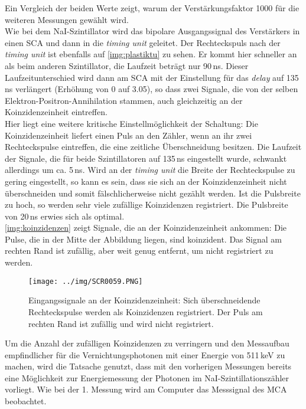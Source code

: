 Ein Vergleich der beiden Werte zeigt, warum der Verstärkungsfaktor 1000 für die weiteren Messungen gewählt wird.\\[\baselineskip]
Wie bei dem NaI-Szintillator wird das bipolare Ausgangssignal des Verstärkers in einen SCA
und dann in die \emph{timing unit} geleitet.
Der Rechteckspuls nach der \emph{timing unit} ist ebenfalls auf \autoref{img:plastiktu} zu sehen.
Er kommt hier schneller an als beim anderen Szintillator, 
die Laufzeit beträgt nur 90\,ns. Dieser Laufzeitunterschied wird dann am SCA mit der
Einstellung für das \emph{delay} auf 135\,ns verlängert (Erhöhung von 0 auf 3.05),
so dass zwei Signale, die von der selben
Elektron-Positron-Annihilation stammen, auch gleichzeitig an der Koinzidenzeinheit eintreffen.\\
Hier liegt eine weitere kritische Einstellmöglichkeit der Schaltung:
Die Koinzidenzeinheit liefert einen Puls an den Zähler, wenn an ihr zwei Rechteckspulse eintreffen,
die eine zeitliche Überschneidung besitzen.
Die Laufzeit der Signale, die für beide Szintillatoren auf 135\,ns eingestellt wurde,
schwankt allerdings um ca. 5\,ns. Wird an der \emph{timing unit}
die Breite der Rechteckspulse zu gering eingestellt, so
kann es sein, dass sie sich an der Koinzidenzeinheit nicht überschneiden und somit fälschlicherweise nicht
gezählt werden. Ist die Pulsbreite zu hoch, so werden sehr viele zufällige Koinzidenzen registriert.
Die Pulsbreite von 20\,ns erwies sich als optimal.\\
\autoref{img:koinzidenzen} zeigt Signale, die an der Koinzidenzeinheit ankommen:
Die Pulse, die in der Mitte der Abbildung liegen, sind koinzident.
Das Signal am rechten Rand ist zufällig, aber weit genug entfernt, um nicht registriert zu werden.
\begin{figure}[H]
\begin{center}
  \texttt{[image: ../img/SCR0059.PNG]}
  \caption{Eingangssignale an der Koinzidenzeinheit: Sich überschneidende Rechteckspulse werden als 
  Koinzidenzen registriert. Der Puls am rechten Rand ist zufällig und wird nicht registriert.}
  \label{img:koinzidenzen}
\end{center}
\end{figure}
Um die Anzahl der zufälligen Koinzidenzen zu verringern
und den Messaufbau empfindlicher für die Vernichtungsphotonen mit einer Energie von 511\,keV zu machen,
wird die Tatsache genutzt, dass mit den vorherigen Messungen bereits eine Möglichkeit zur
Energiemessung der Photonen im NaI-Szintillationszähler vorliegt.
Wie bei der 1. Messung wird am Computer das Messsignal des MCA beobachtet.
